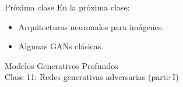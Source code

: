 \documentclass{beamer}
\begin{document}
\begin{frame}{Próxima clase}
    En la próxima clase:
    \begin{itemize}
        \item Arquitecturas neuronales para imágenes.
        \item Algunas GANs clásicas.
    \end{itemize}
\end{frame}

\begin{frame}
    \centering
    \Large{Modelos Generativos Profundos}\\
    \large{Clase 11: Redes generativas adversarias (parte I)}
\end{frame}
\end{document}
